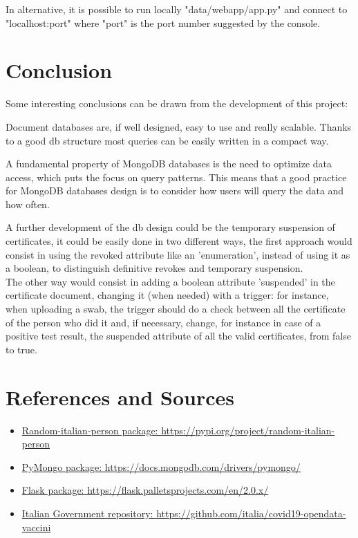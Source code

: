 \documentclass{article}
\begin{document}
In alternative, it is possible to run locally {\selectfont"data/webapp/app.py"} and connect to {\selectfont"localhost:port"} where {\selectfont"port"} is the port number suggested by the console.

\section{Conclusion}

Some interesting conclusions can be drawn from the development of this project:

Document databases are, if well designed, easy to use and really scalable. Thanks to a good db structure most queries can be easily written in a compact way.

A fundamental property of MongoDB databases is the need to optimize data access, which puts the focus on query patterns. This means that a good practice for MongoDB databases design is to consider how users will query the data and how often.

A further development of the db design could be the temporary suspension of certificates, it could be easily done in two different ways, the first approach would consist in using the revoked attribute like an 'enumeration', instead of using it as a boolean, to distinguish definitive revokes and temporary suspension.
\\The other way would consist in adding a boolean attribute 'suspended' in the certificate document, changing it (when needed) with a trigger: for instance, when uploading a swab, the trigger should do a check between all the certificate of the person who did it and, if necessary, change, for instance in case of a positive test result, the suspended attribute of all the valid certificates, from false to true.

\section{References and Sources}
\begin{itemize}
    \item \url{Random-italian-person package: https://pypi.org/project/random-italian-person}
    \item \url{PyMongo package: https://docs.mongodb.com/drivers/pymongo/}
    \item \url{Flask package: https://flask.palletsprojects.com/en/2.0.x/}
    \item \url{Italian Government repository: https://github.com/italia/covid19-opendata-vaccini}
\end{itemize}
\end{document}
